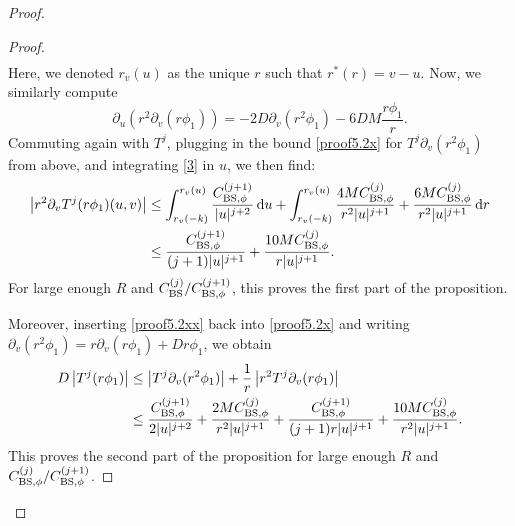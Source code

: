 \documentclass[11pt,english]{article}
\numberwithin{equation}{section}
\theoremstyle{remark}
\theoremstyle{plain}
\theoremstyle{remark}
\newcommand{\dd}{\mathop{}\!\mathrm{d}}
\newcommand{\pu}{\partial_u}
\newcommand{\pv}{\partial_v}
\renewcommand{\(}{\left(}
\renewcommand{\)}{\right)}
\newcommand{\p}{\phi_1}
\newcommand{\pho}{(r\phi_1)}
\begin{document}
\begin{proof}
\begin{proof}
\begin{align}
\end{align}
Here, we denoted $r_v(u)$ as the unique $r$ such that $r^*(r)=v-u$. 
Now, we similarly compute 
\begin{equation}\label{3}
	\pu(r^2\pv(r\p))=-2D\pv(r^2\p)-6DM\frac{r\p}{r}.
\end{equation}
Commuting again with $T^j$, plugging in the bound \eqref{proof5.2x} for $T^j\pv(r^2\phi_1)$ from above, and integrating \eqref{3} in $u$, we then find:
\begin{align}\label{proof5.2xx}
\begin{split}
\left|r^2\pv T^j\pho(u,v)\right|&\leq \int_{r_v(-k)}^{r_v(u)}\frac{\cbsp^{(j+1)}}{|u|^{j+2}}\dd u+\int_{r_v(-k)}^{r_v(u)}\frac{4M\cbsp^{(j)}}{r^2|u|^{j+1}}+\frac{6M\cbsp^{(j)}}{r^2|u|^{j+1}}\dd r\\
&\leq\frac{\cbsp^{(j+1)}}{(j+1)|u|^{j+1}}+\frac{10M\cbsp^{(j)}}{r|u|^{j+1}}.
\end{split}
\end{align}
For large enough $R$ and $C_{\mathrm{BS}}^{(j)}/C_{\mathrm{BS},\phi}^{(j+1)}$, this proves the first part of the proposition.

Moreover, inserting \eqref{proof5.2xx} back into \eqref{proof5.2x} and writing $\pv(r^2\p)=r\pv\pho+Dr\p$, we obtain
\begin{align}
\begin{split}
D\left|T^j\pho\right|&\leq \left|T^j\pv(r^2\p)\right|+\frac{1}{r}\left|r^2T^j\pv\pho\right|\\
			&\leq \frac{\cbsp^{(j+1)}}{2|u|^{j+2}}+\frac{2M\cbsp^{(j)}}{r^2|u|^{j+1}}+\frac{\cbsp^{(j+1)}}{(j+1)r|u|^{j+1}}+\frac{10M\cbsp^{(j)}}{r^2|u|^{j+1}}.
\end{split}
\end{align}
This proves the second part of the proposition for large enough $R$ and $C_{\mathrm{BS},\phi}^{(j)}/C_{\mathrm{BS},\phi}^{(j+1)}$.
\end{proof}

\end{proof}
\end{document}
